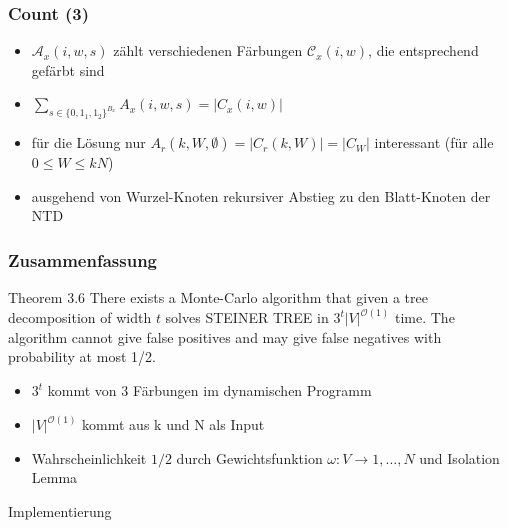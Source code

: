 \documentclass{beamer}
\begin{document}
\begin{frame}
\frametitle{Count (3)}

\begin{itemize}
\pause
\item $\mathcal{A}_x(i,w,s)$ zählt verschiedenen Färbungen $\mathcal{C}_x(i,w)$, die entsprechend gefärbt sind
\pause
\item $\sum\limits_{s \in  \{ 0,1_1,1_2 \}^{B_x} } A_x(i,w,s) = |C_x(i,w)|$
\pause
\item für die Lösung nur $A_r(k,W,\emptyset) = |C_r(k,W)| = |C_W|$ interessant (für alle $0 \leq W \leq kN$)
\pause
\item ausgehend von Wurzel-Knoten rekursiver Abstieg zu den Blatt-Knoten der NTD
\end{itemize}
\end{frame}
\begin{frame}
\frametitle{Zusammenfassung}
\begin{block}{Theorem 3.6}
There exists a Monte-Carlo algorithm that given a tree decomposition of width $t$ solves STEINER TREE in $3^t|V|^{\mathcal{O}(1)}$ time. The algorithm cannot give false positives and may give false negatives with probability at most 1/2.
\end{block}
\begin{itemize}
\pause
\item $3^t$ kommt von 3 Färbungen im dynamischen Programm
\pause
\item $|V|^{\mathcal{O}(1)}$ kommt aus k und N als Input
\pause
\item Wahrscheinlichkeit $1/2$ durch Gewichtsfunktion $\omega:V\rightarrow {1,\dots,N}$ und Isolation Lemma
\end{itemize}
\end{frame}


\begin{frame}
\Huge{\centerline{Implementierung}}
\end{frame}
\end{document}
